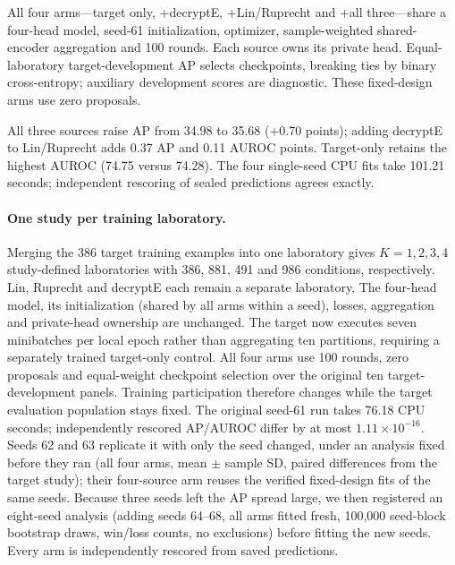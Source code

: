 All four arms---target only, +decryptE, +Lin/Ruprecht and +all three---share a four-head model, seed-61 initialization, optimizer, sample-weighted shared-encoder aggregation and 100 rounds. Each source owns its private head. Equal-laboratory target-development AP selects checkpoints, breaking ties by binary cross-entropy; auxiliary development scores are diagnostic. These fixed-design arms use zero proposals.



All three sources raise AP from 34.98 to 35.68 (+0.70 points); adding decryptE to Lin/Ruprecht adds 0.37 AP and 0.11 AUROC points. Target-only retains the highest AUROC (74.75 versus 74.28). The four single-seed CPU fits take 101.21 seconds; independent rescoring of sealed predictions agrees exactly.

\paragraph{One study per training laboratory.}
Merging the 386 target training examples into one laboratory gives $K=1,2,3,4$ study-defined laboratories with 386, 881, 491 and 986 conditions, respectively. Lin, Ruprecht and decryptE each remain a separate laboratory. The four-head model, its initialization (shared by all arms within a seed), losses, aggregation and private-head ownership are unchanged. The target now executes seven minibatches per local epoch rather than aggregating ten partitions, requiring a separately trained target-only control. All four arms use 100 rounds, zero proposals and equal-weight checkpoint selection over the original ten target-development panels. Training participation therefore changes while the target evaluation population stays fixed. The original seed-61 run takes 76.18 CPU seconds; independently rescored AP/AUROC differ by at most $1.11\times10^{-16}$. Seeds 62 and 63 replicate it with only the seed changed, under an analysis fixed before they ran (all four arms, mean $\pm$ sample SD, paired differences from the target study); their four-source arm reuses the verified fixed-design fits of the same seeds. Because three seeds left the AP spread large, we then registered an eight-seed analysis (adding seeds 64--68, all arms fitted fresh, 100,000 seed-block bootstrap draws, win/loss counts, no exclusions) before fitting the new seeds. Every arm is independently rescored from saved predictions.



